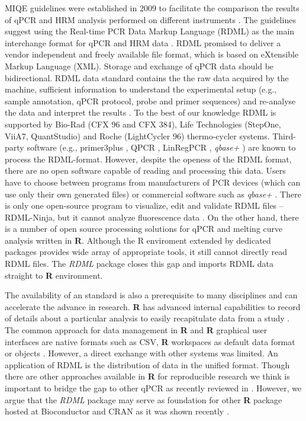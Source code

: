 \documentclass{bioinfo}
\begin{document}
	MIQE guidelines were established in 2009 to facilitate the comparison the
	results of qPCR and HRM analysis performed on different instruments
	\cite{bustin_miqe_2009, huggett_2013}. The guidelines suggest using the
	Real-time PCR Data Markup Language (RDML) as the main interchange format for
	qPCR and HRM data \cite{rdml-ninja_2015}. RDML promised to deliver a vendor
	independent and freely available file format, which is based on eXtensible
	Markup Language (XML). Storage and exchange of qPCR data should be
	bidirectional. RDML data standard contains the the raw data acquired by the
	machine, sufficient information to understand the experimental setup (e.g.,
	sample annotation, qPCR protocol, probe and primer sequences) and re-analyse the
	data and interpret the results \cite{lefever_rdml:_2009}. To the best of our
	knowledge RDML is supported by Bio-Rad (CFX 96 and CFX 384), Life Technologies
	(StepOne, ViiA7, QuantStudio) and Roche (LightCycler 96) thermo-cycler systems.
	Third-party software (e.g., primer3plus \cite{untergasser_2007}, QPCR
	\cite{pabinger_2009}, LinRegPCR \cite{ruijter_2014}, \textit{qbase+}
	\cite{hellemans_2007}) are known to process the RDML-format. However, despite
	the openess of the RDML format, there are no open software capable of reading
	and processing this data. Users have to choose between programs from
	manufacturers of PCR devices (which can use only their own generated files) or
	commercial software such as \textit{qbase+} \cite{rdml}. There is only one
	open-source program to visualize, edit and validate RDML files -- RDML-Ninja,
	but it cannot analyze fluorescence data \cite{rdml-ninja_2015}. On the other
	hand, there is a number of open source processing solutions for qPCR 
	\cite{ritz_qpcr:_2008, rodiger2015chippcr} and melting curve analysis 
	\cite{roediger_RJ_2013,cousins_2012} written in \textbf{R}. 
	Although the R enviroment extended by dedicated packages provides wide array of
	appropriate tools, it still cannot directly read RDML files. 
	The \textit{RDML} package closes this gap and imports RDML data straight to
	\textbf{R} environment.
	
	
	The availability of an standard is also a prerequisite to many disciplines and
	can accelerate the advance in research. \textbf{R} has advanced internal
	capabilities to record of details about a particular analysis to easily
	recapitulate data from a study \cite{liu_2014}. The common approach for data
	management in \textbf{R} and \textbf{R} graphical user interfaces are native
	formats such as CSV, \textbf{R} workspaces as default data format or objects
	\cite{rodiger_rkward_2012, pabinger_2014, RDCT2014c}. However, a direct exchange
	with other systems was limited. An application of RDML is the distribution of
	data in the unified format. Though there are other approaches available in
	\textbf{R} for reproducible research \cite{Leeper_2014} we think is important to
	bridge the gap to other qPCR as recently reviewed in \cite{pabinger_2014}. However, we 
	argue that the \textit{RDML} package may serve as foundation for other \textbf{R} package
	hosted at Bioconductor \cite{gentleman_2004} and CRAN \cite{RCT} as it was shown
	recently \cite{rodiger2015r}.
	
\end{document}

